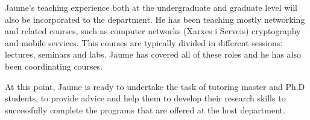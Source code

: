 \documentclass[a4paper,twocolumns]{article}%
\begin{document}
Jaume's teaching experience both at the undergraduate and graduate level will also be incorporated to the department.
He has been teaching mostly networking and related courses, such as computer networks (Xarxes i Serveis) cryptography and mobile services.
This courses are typically divided in different sessions: lectures, seminars and labs.
Jaume has covered all of these roles and he has also been coordinating courses.

At this point, Jaume is ready to undertake the task of tutoring master and Ph.D students, to provide advice and help them to develop their research skills to successfully complete the programs that are offered at the host department.



\end{document}
